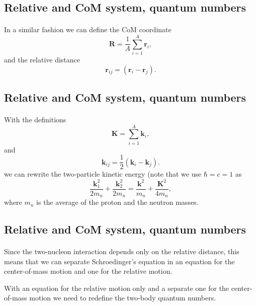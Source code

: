 \documentclass[%
twoside,                 %
final,                   %
10pt]{article}
\begin{document}
\subsection*{Relative and CoM system, quantum numbers}

\paragraph{}

In a similar fashion we can define the CoM coordinate
 \[
     \mathbf{R}=\frac{1}{A}\sum_{i=1}^{A}\mathbf{r}_i,
 \]
 and the relative distance 
\[
    \mathbf{r}_{ij}=(\mathbf{r}_i-\mathbf{r}_j).
 \]



\subsection*{Relative and CoM system, quantum numbers}

\paragraph{}
With the definitions
 \[
    \mathbf{K}=\sum_{i=1}^A\mathbf{k}_i,
 \]
and
\[
    \mathbf{k}_{ij}=\frac{1}{2}(\mathbf{k}_i-\mathbf{k}_j).
 \]
we can rewrite the two-particle kinetic energy (note that we use $\hbar=c=1$ as 
\[
\frac{\mathbf{k}_1^2}{2m_n}+\frac{\mathbf{k}_2^2}{2m_n}=\frac{\mathbf{k}^2}{m_n}+\frac{\mathbf{K}^2}{4m_n},
\]
where $m_n$ is the average of the proton and the neutron masses.




\subsection*{Relative and CoM system, quantum numbers}

\paragraph{}

Since the two-nucleon interaction depends only on the relative distance, this means that we can separate Schroedinger's equation in an equation for the center-of-mass motion and one for the relative motion.

With an equation for the relative motion only and a separate one for the center-of-mass motion we need to redefine the two-body quantum numbers.
\end{document}
